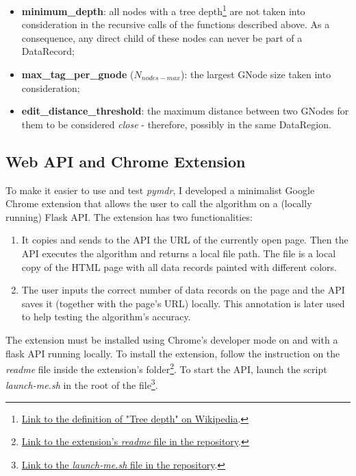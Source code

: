 \documentclass[10pt]{article}
\newcommand{\maxnodes}{N_{nodes-max}}
\begin{document}
\begin{itemize}
    
    \item \textbf{minimum\_depth}: all nodes with a tree depth\footnote{\href{https://en.wikipedia.org/wiki/Tree-depth}{Link to the definition of "Tree depth" on Wikipedia}.} are not taken into consideration in the recursive calls of the functions described above. As a consequence, any direct child of these nodes can never be part of a DataRecord;
    
    \item \textbf{max\_tag\_per\_gnode} ($\maxnodes$): the largest GNode size taken into consideration;
    
    \item \textbf{edit\_distance\_threshold}: the maximum distance between two GNodes for them to be considered \emph{close} - therefore, possibly in the same DataRegion.
    
\end{itemize}



\subsection{Web API and Chrome Extension}

To make it easier to use and test \emph{pymdr}, I developed a minimalist Google Chrome extension that allows the user to call the algorithm on a (locally running) Flask API. The extension has two functionalities:  

\begin{enumerate}
    
    \item It copies and sends to the API the URL of the currently open page. Then the API executes the algorithm and returns a local file path. The file is a local copy of the HTML page with all data records painted with different colors.
    
    \item The user inputs the correct number of data records on the page and the API saves it (together with the page's URL) locally. This annotation is later used to help testing the algorithm's accuracy.
    
\end{enumerate}

The extension must be installed using Chrome's developer mode on and with a flask API running locally. To install the extension, follow the instruction on the \emph{readme} file inside the extension's folder\footnote{\href{https://github.com/joaopcbertoldo/pymdr/blob/7ff7f7653feff23704b6b786db8499188ba378af/src/extension/readme.txt\#L1}{Link to the extension's \emph{readme} file in the repository}.}. To start the API, launch the script \emph{launch-me.sh} in the root of the file\footnote{\href{https://github.com/joaopcbertoldo/pymdr/blob/7ff7f7653feff23704b6b786db8499188ba378af/launch-api.sh\#L1}{Link to the \emph{launch-me.sh} file in the repository}.}.
\end{document}
